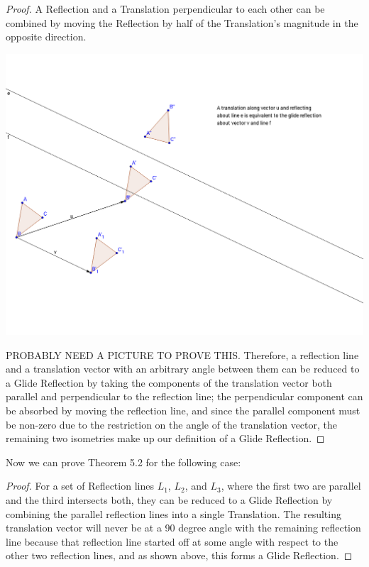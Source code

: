 \documentclass[11pt]{article}
\theoremstyle{definition}
\begin{document}
\begin{proof}
  A Reflection and a Translation perpendicular to each other can be combined by
  moving the Reflection by half of the Translation's magnitude in the opposite
  direction.



  \includegraphics[scale=.4]{glide}



  PROBABLY NEED A PICTURE TO PROVE THIS.
  Therefore, a reflection line and a translation vector with an arbitrary angle
  between them can be reduced to a Glide Reflection by taking the components of
  the translation vector both parallel and perpendicular to the reflection
  line; the perpendicular component can be absorbed by moving the reflection
  line, and since the parallel component must be non-zero due to the
  restriction on the angle of the translation vector, the remaining two
  isometries make up our definition of a Glide Reflection.
\end{proof}

Now we can prove Theorem 5.2 for the following case:

\begin{proof}
  For a set of Reflection lines $L_{1}$, $L_{2}$, and $L_{3}$, where the first
  two are parallel and the third intersects both, they can be reduced to a
  Glide Reflection by combining the parallel reflection lines into a single
  Translation. The resulting translation vector will never be at a 90 degree
  angle with the remaining reflection line because that reflection line started
  off at some angle with respect to the other two reflection lines, and as
  shown above, this forms a Glide Reflection.
\end{proof}
\end{document}
